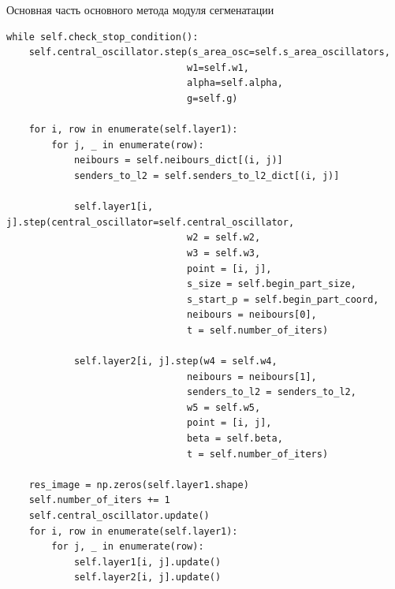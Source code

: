 \documentclass[14pt, russian]{scrartcl}
\begin{document}
\begin{listing}[!htt]
    \caption{Основная часть основного метода модуля сегменатации}
    \label{lst:contour_extr_sobel}
    \begin{verbatim}
while self.check_stop_condition():
    self.central_oscillator.step(s_area_osc=self.s_area_oscillators, 
                                w1=self.w1, 
                                alpha=self.alpha,
                                g=self.g)

    for i, row in enumerate(self.layer1):
        for j, _ in enumerate(row):
            neibours = self.neibours_dict[(i, j)]
            senders_to_l2 = self.senders_to_l2_dict[(i, j)]

            self.layer1[i, j].step(central_oscillator=self.central_oscillator, 
                                w2 = self.w2, 
                                w3 = self.w3, 
                                point = [i, j], 
                                s_size = self.begin_part_size,
                                s_start_p = self.begin_part_coord,
                                neibours = neibours[0],
                                t = self.number_of_iters)
            
            self.layer2[i, j].step(w4 = self.w4,
                                neibours = neibours[1],
                                senders_to_l2 = senders_to_l2, 
                                w5 = self.w5,
                                point = [i, j],
                                beta = self.beta,
                                t = self.number_of_iters)
            
    res_image = np.zeros(self.layer1.shape)
    self.number_of_iters += 1
    self.central_oscillator.update()
    for i, row in enumerate(self.layer1):
        for j, _ in enumerate(row):
            self.layer1[i, j].update()
            self.layer2[i, j].update()
    \end{verbatim}
\end{listing}
\end{document}
